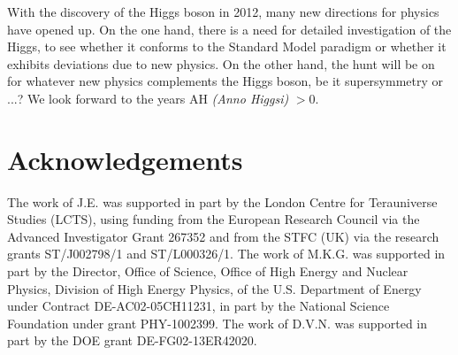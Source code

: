\documentclass[12pt]{article}
\numberwithin{equation}{section}
\begin{document}
With the discovery of the Higgs boson in 2012, many new directions for physics have
opened up. On the one hand, there is a need for detailed investigation of the Higgs, to see whether
it conforms to the Standard Model paradigm or whether it exhibits deviations due to new physics.
On the other hand, the hunt will be on for whatever new physics complements the Higgs boson, be it
supersymmetry or ...? We look forward to the
years AH {\it (Anno Higgsi)} $> 0$.


\section*{Acknowledgements}

The work of J.E. was supported in part by
the London Centre for Terauniverse Studies (LCTS), using funding from
the European Research Council 
via the Advanced Investigator Grant 267352 and from the STFC
(UK) via the research grants ST/J002798/1 and ST/L000326/1. 
The work of M.K.G. was supported in part by the Director, Office of Science,
Office of High Energy and Nuclear Physics, Division of High Energy
Physics, of the U.S. Department of Energy under Contract
DE-AC02-05CH11231, in part by the National Science Foundation under
grant PHY-1002399.
The work of D.V.N. was supported in part by the
DOE grant DE-FG02-13ER42020.
\end{document}

